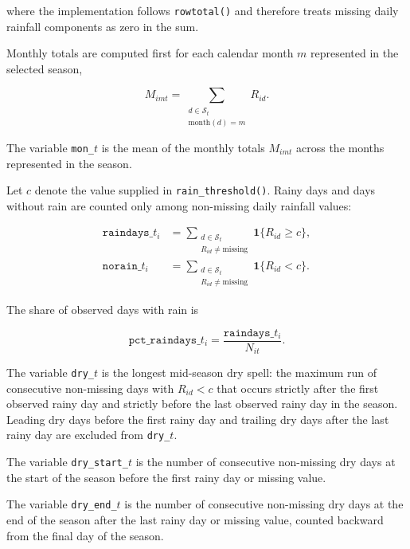 \noindent where the implementation follows \texttt{rowtotal()} and therefore treats missing daily rainfall components as zero in the sum.

Monthly totals are computed first for each calendar month $m$ represented in the selected season,

\begin{equation}
	M_{imt} = \sum_{\substack{d \in \mathcal{S}_{t} \\ \text{month} (d) = m}} R_{id}.
\end{equation}

\noindent The variable \texttt{mon\_}$t$ is the mean of the monthly totals $M_{imt}$ across the months represented in the season.

Let $c$ denote the value supplied in \texttt{rain\_threshold()}. Rainy days and days without rain are counted only among non-missing daily rainfall values:

\begin{align}
	\texttt{raindays\_} t_i & = \sum_{\substack{d \in \mathcal{S}_{t} \\ R_{id} \neq \text{missing}}} \mathbf{1}\{R_{id} \geq c\}, \\
	\texttt{norain\_} t_i & = \sum_{\substack{d \in \mathcal{S}_{t} \\ R_{id} \neq \text{missing}}} \mathbf{1}\{R_{id} < c\}.
\end{align}

\noindent The share of observed days with rain is

\begin{equation}
	\texttt{pct\_raindays\_} t_i = \frac{\texttt{raindays\_} t_i}{N_{it}}.
\end{equation}

The variable \texttt{dry\_}$t$ is the longest mid-season dry spell: the maximum run of consecutive non-missing days with $R_{id} < c$ that occurs strictly after the first observed rainy day and strictly before the last observed rainy day in the season. Leading dry days before the first rainy day and trailing dry days after the last rainy day are excluded from \texttt{dry\_}$t$.

The variable \texttt{dry\_start\_}$t$ is the number of consecutive non-missing dry days at the start of the season before the first rainy day or missing value.

The variable \texttt{dry\_end\_}$t$ is the number of consecutive non-missing dry days at the end of the season after the last rainy day or missing value, counted backward from the final day of the season.

